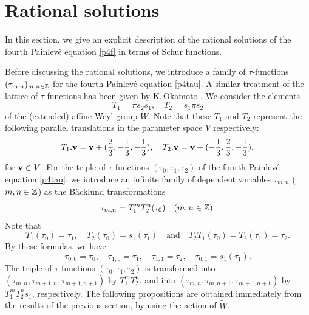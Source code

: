 \section{Rational solutions}
In this section, we give an explicit description of the rational solutions 
of the fourth Painlev\'e equation \eqref{p4f} in terms of Schur functions.  
\par\medskip
Before discussing the rational solutions, we introduce a family of $\tau$-functions
$(\tau_{m, n})_{m,n\in{\Bbb Z}}$ for the fourth Painlev\'e 
equation \eqref{p4tau}. 
A similar treatment of the lattice of $\tau$-functions has been 
given by K.\,Okamoto \cite{Ok1}. 
We consider the elements 
\begin{equation}
T_1=\pi s_2 s_1, \quad T_2=s_1 \pi s_2
\end{equation}
of the (extended) affine Weyl group $\widetilde{W}$.
Note that these $T_1$ and $T_2$ represent the following 
parallel translations in the parameter space $V$ respectively: 
\begin{equation}
T_1.\mbox{\bf v}=\mbox{\bf v}+(\frac{2}{3},-\frac{1}{3},-\frac{1}{3}),\quad 
T_2.\mbox{\bf v}=\mbox{\bf v}+(-\frac{1}{3},\frac{2}{3},-\frac{1}{3}),
\end{equation}
for $\mbox{\bf v}\in V$. 
For the triple of $\tau$-functions $(\tau_0,\tau_1, \tau_2)$ of the fourth 
Painlev\'e equation \eqref{p4tau}, 
we introduce an infinite family of dependent variables 
$\tau_{m,n}$ ($m,n\in{\Bbb Z}$) as the B\"acklund transformations 
\begin{equation}
\tau_{m,n} =T_1^m T_2^n (\tau_0)\quad(m,n\in{\Bbb Z}). 
\end{equation}
Note that 
\begin{equation}
T_1(\tau_0)=\tau_1, \quad T_2(\tau_0)=s_1(\tau_1)\quad
\mbox{and} \quad T_2T_1(\tau_0)=T_2(\tau_1)=\tau_2. 
\end{equation}
By these formulas, we have
\begin{equation}
\tau_{0,0}=\tau_0,\quad \tau_{1,0}=\tau_1,\quad
\tau_{1,1}=\tau_2,\quad \tau_{0,1}=s_1(\tau_1). 
\end{equation}
The triple of $\tau$-functions $(\tau_0,\tau_1,\tau_2)$ 
is transformed into 
$(\tau_{m,n},\tau_{m+1,n},\tau_{m+1,n+1})$
by $T_1^m T_2^n$, and into 
$(\tau_{m,n},\tau_{m,n+1},\tau_{m+1,n+1})$
by $T_1^m T_2^n s_1$, respectively. 
The following propositions are obtained 
immediately from the results of the previous section,  
by using the action of $\widetilde{W}$. 

